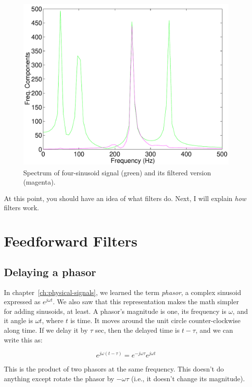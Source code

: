 \begin{figure}
\centerline{\includegraphics[height=3.5in]{ch-fir/sine4_sp}}
\caption[Unfiltered vs. filtered signal]{Spectrum of four-sinusoid
signal (green) and its filtered version
(magenta).\label{fig:sine4-sp}}
\end{figure}

At this point, you should have an idea of what filters do. Next, I
will explain \emph{how} filters work.

\section{Feedforward Filters}

\subsection{Delaying a phasor}

In chapter~\ref{ch:physical-signals}, we learned the term
\emph{phasor}, a complex sinusoid expressed as $e^{j\omega t}$.  We
also saw that this representation makes the math simpler for adding
sinusoids, at least.  A phasor's magnitude is one, its frequency is
$\omega$, and it angle is $\omega t$, where $t$ is time. It moves
around the unit circle counter-clockwise along time.  If we delay it
by $\tau$ sec, then the delayed time is $t-\tau$, and we can write
this as:

\begin{equation}
e^{j\omega (t-\tau)} = e^{-j\omega \tau} e^{j\omega t}
\end{equation}

This is the product of two phasors at the same frequency.
This doesn't do anything except rotate the phasor by $-\omega \tau$
(i.e., it doesn't change its magnitude).

